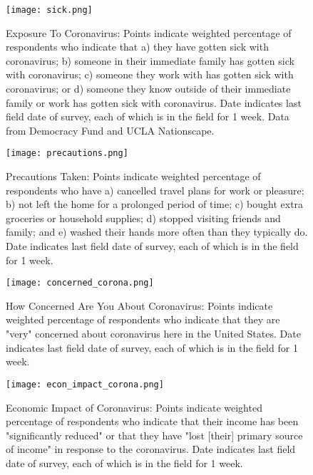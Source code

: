 \documentclass[landscape]{article}
\begin{document}
\newpage
\begin{figure}
\begin{center}
\texttt{[image: sick.png]}
\end{center}
\caption{Exposure To Coronavirus: Points indicate weighted percentage of respondents who indicate that a) they have gotten sick with coronavirus; b) someone in their immediate family has gotten sick with coronavirus; c) someone they work with has gotten sick with coronavirus; or d) someone they know outside of their immediate family or work has gotten sick with coronavirus. Date indicates last field date of survey, each of which is in the field for 1 week. Data from Democracy Fund and UCLA Nationscape.}
\end{figure}

\begin{figure}
\begin{center}
\texttt{[image: precautions.png]}
\end{center}
\caption{Precautions Taken: Points indicate weighted percentage of respondents who have a) cancelled travel plans for work or pleasure; b) not left the home for a prolonged period of time; c) bought extra groceries or household supplies; d) stopped visiting friends and family; and e) washed their hands more often than they typically do. Date indicates last field date of survey, each of which is in the field for 1 week.}
\end{figure}

\begin{figure}
\begin{center}
\texttt{[image: concerned\_corona.png]}
\end{center}
\caption{How Concerned Are You About Coronavirus: Points indicate weighted percentage of respondents who indicate that they are "very" concerned about coronavirus here in the United States. Date indicates last field date of survey, each of which is in the field for 1 week.}
\end{figure}

\begin{figure}
\begin{center}
\texttt{[image: econ\_impact\_corona.png]}
\end{center}
\caption{Economic Impact of Coronavirus: Points indicate weighted percentage of respondents who indicate that their income has been "significantly reduced" or that they have "lost [their] primary source of income" in response to the coronavirus. Date indicates last field date of survey, each of which is in the field for 1 week.}
\end{figure}
\end{document}
